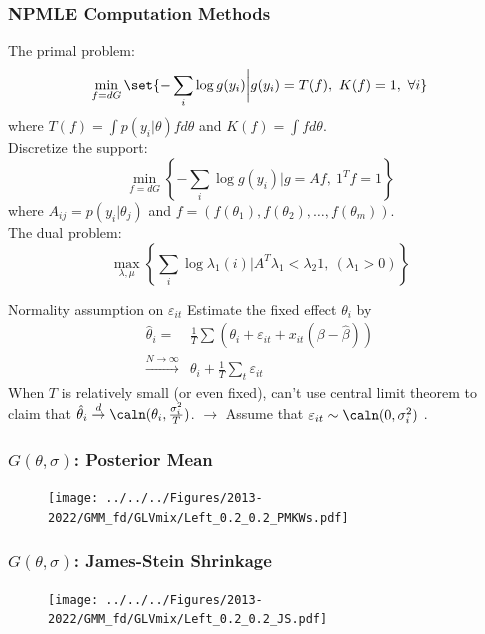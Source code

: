 \documentclass[10pt, aspectratio=169]{beamer}
\begin{document}
\begin{frame}
  \frametitle{NPMLE Computation Methods}

  The primal problem:
  \begin{equation*}
    \min_{f=dG}\set{-\sum_i \log g(y_i)\bigg |g(y_i) = T(f),\ K(f)=1,\ \forall i }
  \end{equation*}
  where $ T(f)=\int p(y_i |\theta)fd\theta $ and  $K(f)= \int f d\theta$.\\
  Discretize the support:
  \begin{equation*}
    \min_{f=dG}\left\{-\sum_i \log g(y_i)\bigg |g=Af,\ {1^T}f=1\right\}
  \end{equation*}
  where $A_{ij}= p(y_i|\theta_j) $ and $ f = (f(\theta_1),f(\theta_2),\ldots,f(\theta_m))$.\\
  The dual problem:
  \begin{equation*}
    \max_{\lambda,\mu} \left\{ \sum_i \log \lambda_1(i) \bigg| A^T\lambda_1 < \lambda_2 1,\ (\lambda_1>0) \right\}
  \end{equation*}
\end{frame}

\begin{frame}[label=normality]{Normality assumption on $\varepsilon_{it}$}
  Estimate the fixed effect $\theta_i$ by
  \begin{align*}
    \hat{\theta}_i =                       & \frac{1}{T}\sum(\theta_i+\varepsilon_{it}+x_{it}(\beta-\hat{\beta})) \\
    \overset{N\to \infty}{\longrightarrow} & \theta_i+\frac{1}{T}\sum_t \varepsilon_{it}
  \end{align*}
  When $T$ is relatively small (or even fixed), can't use central limit theorem to claim that $\hat{\theta}_i \overset{d}{\to} \caln(\theta_i,\frac{\sigma_i^2}{T})$.
  $\longrightarrow$ Assume that $\varepsilon_{it} \sim \caln(0,\sigma_i^2)$ .
  \hyperlink{observation}{}   \hyperlink{limitation}{}
\end{frame}

\begin{frame}
  \frametitle{$G(\theta,\sigma)$: Posterior Mean}
  \begin{figure}
    \centering
    \texttt{[image: ../../../Figures/2013-2022/GMM\_fd/GLVmix/Left\_0.2\_0.2\_PMKWs.pdf]}
  \end{figure}
\end{frame}

\begin{frame}
  \frametitle{$G(\theta,\sigma)$: James-Stein Shrinkage}
  \begin{figure}
    \centering
    \texttt{[image: ../../../Figures/2013-2022/GMM\_fd/GLVmix/Left\_0.2\_0.2\_JS.pdf]}
  \end{figure}
\end{frame}
\end{document}
